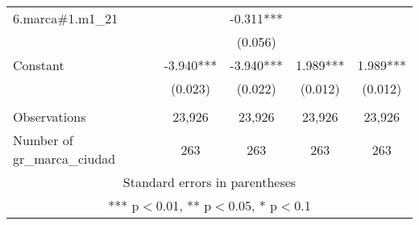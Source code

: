 \begin{tabular}{lcccc}
6.marca\#1.m1\_21 &  & -0.311*** &  &  \\
 &  & (0.056) &  &  \\
Constant & -3.940*** & -3.940*** & 1.989*** & 1.989*** \\
 & (0.023) & (0.022) & (0.012) & (0.012) \\
 &  &  &  &  \\
Observations & 23,926 & 23,926 & 23,926 & 23,926 \\
 Number of gr\_marca\_ciudad & 263 & 263 & 263 & 263 \\ \hline
\multicolumn{5}{c}{ Standard errors in parentheses} \\
\multicolumn{5}{c}{ *** p$<$0.01, ** p$<$0.05, * p$<$0.1} \\
\end{tabular}
